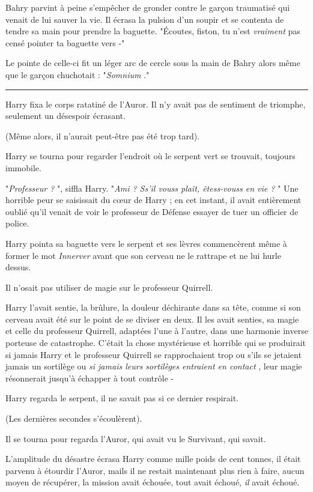 Bahry parvint à peine s'empêcher de gronder contre le garçon traumatisé qui venait de lui sauver la vie. Il écrasa la pulsion d'un soupir et se contenta de tendre sa main pour prendre la baguette. "Écoutes, fiston, tu n'est \emph{vraiment}  pas censé pointer ta baguette vers -"

Le pointe de celle-ci fit un léger arc de cercle sous la main de Bahry alors même que le garçon chuchotait : "\emph{Somnium} ."
\par\noindent\rule{\textwidth}{0.4pt}
Harry fixa le corps ratatiné de l'Auror. Il n'y avait pas de sentiment de triomphe, seulement un désespoir écrasant.

(Même alors, il n'aurait peut-être pas été trop tard).

Harry se tourna pour regarder l'endroit où le serpent vert se trouvait, toujours immobile.

"\emph{Professeur ?} ", siffla Harry. "\emph{Ami ? Ss'il vouss plaît, êtess-vouss en vie ?} " Une horrible peur se saisissait du cœur de Harry ; en cet instant, il avait entièrement oublié qu'il venait de voir le professeur de Défense essayer de tuer un officier de police.

Harry pointa sa baguette vers le serpent et ses lèvres commencèrent même à former le mot \emph{Innerver}  avant que son cerveau ne le rattrape et ne lui hurle dessus.

Il n'osait pas utiliser de magie sur le professeur Quirrell.

Harry l'avait sentie, la brûlure, la douleur déchirante dans sa tête, comme si son cerveau avait été sur le point de se diviser en deux. Il les avait senties, sa magie et celle du professeur Quirrell, adaptées l'une à l'autre, dans une harmonie inverse porteuse de catastrophe. C'était la chose mystérieuse et horrible qui se produirait si jamais Harry et le professeur Quirrell se rapprochaient trop ou s'ils se jetaient jamais un sortilège ou \emph{si jamais leurs sortilèges entraient en contact} , leur magie résonnerait jusqu'à échapper à tout contrôle -

Harry regarda le serpent, il ne savait pas si ce dernier respirait.

(Les dernières secondes s'écoulèrent).

Il se tourna pour regarda l'Auror, qui avait vu le Survivant, qui savait.

L'amplitude du désastre écrasa Harry comme mille poids de cent tonnes, il était parvenu à étourdir l'Auror, mails il ne restait maintenant plus rien à faire, aucun moyen de récupérer, la mission avait échouée, tout avait échoué, \emph{il}  avait échoué.

